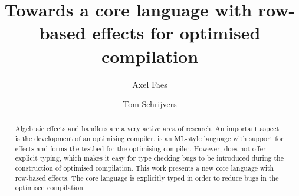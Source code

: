 \documentclass[sigplan,10pt]{acmart}\settopmatter{printfolios=true}
\begin{document}
\title{Towards a core language with row-based effects for optimised compilation}

\author{Axel Faes}

\author{Tom Schrijvers}


\begin{abstract}
Algebraic effects and handlers are a very active area of research. An important aspect is the development of an optimising compiler. \eff is an ML-style language with support for effects and forms the testbed for the optimising compiler. However, \eff does not offer explicit typing, which makes it easy for type checking bugs to be introduced during the construction of optimised compilation. This work presents a new core language with row-based effects. The core language is explicitly typed in order to reduce bugs in the optimised compilation.
\end{abstract}

\maketitle
\end{document}
